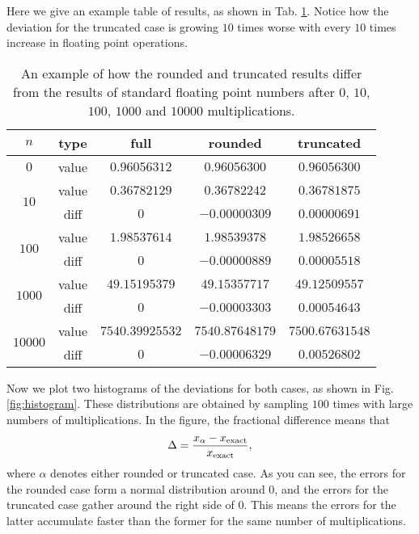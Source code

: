 Here we give an example table of results, as shown in Tab. \ref{tab:compare}. Notice how the
deviation for the truncated case is growing $10$ times worse with every $10$ times increase
in floating point operations.

\begin{table}
    \centering
    \caption{An example of how the rounded and truncated results differ from the results of
        standard floating point numbers after $0$, $10$, $100$, $1000$ and $10000$
        multiplications.}
    \label{tab:compare}
    \begin{tabular}{@{}ccccc@{}}
        \toprule
        $n$                      & type  & full            & rounded         & truncated       \\
        \midrule
        $0$                      & value & $0.96056312$    & $0.96056300$    & $0.96056300$    \\
        \cmidrule{1-2}
        \multirow{2}{*}{$10$}    & value & $0.36782129$    & $0.36782242$    & $0.36781875$    \\
                                 & diff  & $0$             & $-0.00000309$   & $0.00000691$    \\
        \cmidrule{1-2}
        \multirow{2}{*}{$100$}   & value & $1.98537614$    & $1.98539378$    & $1.98526658$    \\
                                 & diff  & $0$             & $-0.00000889$   & $0.00005518$    \\
        \cmidrule{1-2}
        \multirow{2}{*}{$1000$}  & value & $49.15195379$   & $49.15357717$   & $49.12509557$   \\
                                 & diff  & $0$             & $-0.00003303$   & $0.00054643$    \\
        \cmidrule{1-2}
        \multirow{2}{*}{$10000$} & value & $7540.39925532$ & $7540.87648179$ & $7500.67631548$ \\
                                 & diff  & $0$             & $-0.00006329$   & $0.00526802$    \\
        \bottomrule
    \end{tabular}
\end{table}

Now we plot two histograms of the deviations for both cases, as shown in
Fig. \ref{fig:histogram}.
These distributions are obtained by sampling $100$ times with
large numbers of multiplications.
In the figure, the fractional difference means that
%
\begin{equation}
    \Delta = \frac{x_{\alpha} - x_\textnormal{exact}}{x_\textnormal{exact}},
\end{equation}
%
where $\alpha$ denotes either rounded or truncated case.
As you can see, the errors for the rounded case form a normal distribution around
$0$, and the errors for the truncated case gather around the right side of $0$.
This means the errors for the latter accumulate faster than the former for the same
number of multiplications.

